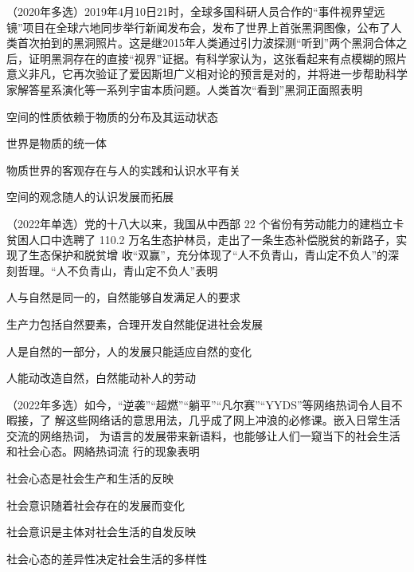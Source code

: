 \documentclass[lang=cn,newtx,10pt,scheme=chinese,pad,twocol]{zznote}
\begin{document}
\begin{example} （2020年多选）2019年4月10日21时，全球多国科研人员合作的“事件视界望远镜”项目在全球六地同步举行新闻发布会，发布了世界上首张黑洞图像，公布了人类首次拍到的黑洞照片。这是继2015年人类通过引力波探测“听到”两个黑洞合体之后，证明黑洞存在的直接“视界”证据。有科学家认为，这张看起来有点模糊的照片意义非凡，它再次验证了爱因斯坦广义相对论的预言是对的，并将进一步帮助科学家解答星系演化等一系列宇宙本质问题。人类首次“看到”黑洞正面照表明
	\begin{choice}
		\item 空间的性质依赖于物质的分布及其运动状态
		\item 世界是物质的统一体
		\item 物质世界的客观存在与人的实践和认识水平有关
		\item 空间的观念随人的认识发展而拓展
	\end{choice}
\end{example}


\begin{example}	（2022年单选）党的十八大以来，我国从中西部 22 个省份有劳动能力的建档立卡贫困人口中选聘了
	110.2 万名生态护林员，走出了一条生态补偿脱贫的新路子，实现了生态保护和脱贫增
	收“双赢”，充分体现了“人不负青山，青山定不负人”的深刻哲理。“人不负青山，青山定不负人”表明
	\begin{choice}
		\item 人与自然是同一的，自然能够自发满足人的要求
		\item 生产力包括自然要素，合理开发自然能促进社会发展
		\item 人是自然的一部分，人的发展只能适应自然的变化
		\item 人能动改造自然，白然能动补人的劳动
	\end{choice}
\end{example}


\begin{example}	（2022年多选）如今，“逆袭”“超燃”“躺平”“凡尔赛”“YYDS”等网络热词令人目不暇接，了
	解这些网络话的意思用法，几乎成了网上冲浪的必修课。嵌入日常生活交流的网络热词，
	为语言的发展带来新语料，也能够让人们一窥当下的社会生活和社会心态。网絡热词流
	行的现象表明
	\begin{choice}
		\item 社会心态是社会生产和生活的反映
		\item 社会意识随着社会存在的发展而变化
		\item 社会意识是主体对社会生活的自发反映
		\item 社会心态的差异性决定社会生活的多样性
	\end{choice}
\end{example}
\end{document}
